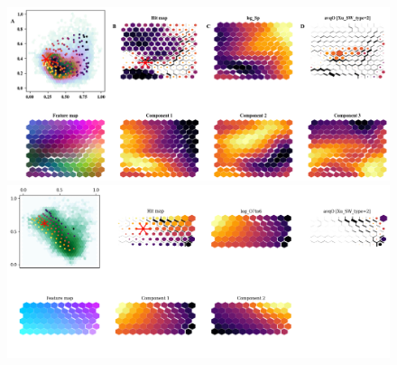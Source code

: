 \documentclass[border=0pt,varwidth=15cm,convert={outext=.jpeg,density=300}]{standalone}%
\begin{document}
\pagecolor{white}%
	\begin{figure}[h!]%
		\begin{center}%
			\includegraphics[width=15cm]{XuBorovsky/maps}\\%
			\includegraphics[width=15cm]{ZhaZuFi/maps}%
		\end{center}%
	\end{figure}%
\end{document}
